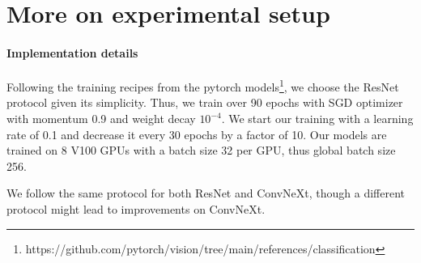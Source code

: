 \section{More on experimental setup}

\paragraph{Implementation details}

Following the training recipes from the pytorch models\footnote{https://github.com/pytorch/vision/tree/main/references/classification}, we choose the ResNet protocol given its simplicity. Thus, we train over 90 epochs with SGD optimizer with momentum 0.9 and weight decay $10^{-4}$. We start our training with a learning rate of 0.1 and decrease it every 30 epochs by a factor of 10. Our models are trained on 8 V100 GPUs with a batch size 32 per GPU,  thus global batch size 256.

We follow the same protocol for both ResNet and ConvNeXt, though a different protocol might lead to improvements on ConvNeXt.




